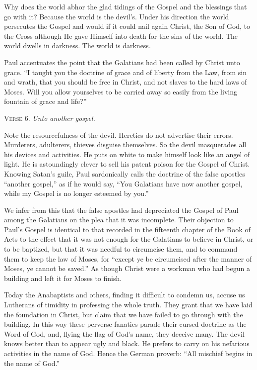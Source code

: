 Why does the world abhor the glad tidings of the Gospel and the blessings that go with it? Because the world is the devil’s. Under his direction the world persecutes the Gospel and would if it could nail again Christ, the Son of God, to the Cross although He gave Himself into death for the sins of the world. The world dwells in darkness. The world is darkness.

Paul accentuates the point that the Galatians had been called by Christ unto grace. “I taught you the doctrine of grace and of liberty from the Law, from sin and wrath, that you should be free in Christ, and not slaves to the hard laws of Moses. Will you allow yourselves to be carried away so easily from the living fountain of grace and life?”

\textsc{Verse} 6. \emph{Unto another gospel.}

Note the resourcefulness of the devil. Heretics do not advertise their errors. Murderers, adulterers, thieves disguise themselves. So the devil masquerades all his devices and activities. He puts on white to make himself look like an angel of light. He is astoundingly clever to sell his patent poison for the Gospel of Christ. Knowing Satan’s guile, Paul sardonically calls the doctrine of the false apostles “another gospel,” as if he would say, “You Galatians have now another gospel, while my Gospel is no longer esteemed by you.”

We infer from this that the false apostles had depreciated the Gospel of Paul among the Galatians on the plea that it was incomplete. Their objection to Paul’s Gospel is identical to that recorded in the fifteenth chapter of the Book of Acts to the effect that it was not enough for the Galatians to believe in Christ, or to be baptized, but that it was needful to circumcise them, and to command them to keep the law of Moses, for “except ye be circumcised after the manner of Moses, ye cannot be saved.” As though Christ were a workman who had begun a building and left it for Moses to finish.

Today the Anabaptists and others, finding it difficult to condemn us, accuse us Lutherans of timidity in professing the whole truth. They grant that we have laid the foundation in Christ, but claim that we have failed to go through with the building. In this way these perverse fanatics parade their cursed doctrine as the Word of God, and, flying the flag of God’s name, they deceive many. The devil knows better than to appear ugly and black. He prefers to carry on his nefarious activities in the name of God. Hence the German proverb: “All mischief begins in the name of God.”


